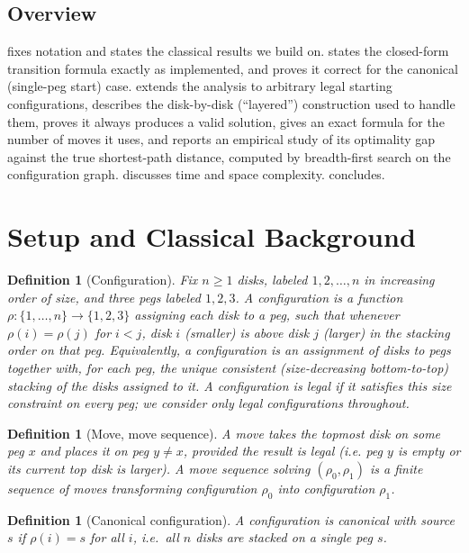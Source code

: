 \documentclass[11pt]{article}
\newtheorem{definition}[theorem]{Definition}
\begin{document}
\subsection{Overview}

 fixes notation and states the classical results we build
on.  states the closed-form transition formula exactly as
implemented, and proves it correct for the canonical (single-peg start)
case.  extends the analysis to arbitrary legal starting
configurations, describes the disk-by-disk (``layered'') construction used
to handle them, proves it always produces a valid solution, gives an exact
formula for the number of moves it uses, and reports an empirical study of
its optimality gap against the true shortest-path distance, computed by
breadth-first search on the configuration graph. 
discusses time and space complexity.  concludes.

\section{Setup and Classical Background}
\label{sec:setup}

\begin{definition}[Configuration]
Fix $n \ge 1$ disks, labeled $1, 2, \dots, n$ in increasing order of size,
and three pegs labeled $1,2,3$. A \emph{configuration} is a function
$\rho : \{1,\dots,n\} \to \{1,2,3\}$ assigning each disk to a peg, such that
whenever $\rho(i) = \rho(j)$ for $i < j$, disk $i$ (smaller) is above disk
$j$ (larger) in the stacking order on that peg. Equivalently, a
configuration is an assignment of disks to pegs together with, for each
peg, the unique consistent (size-decreasing bottom-to-top) stacking of the
disks assigned to it. A configuration is \emph{legal} if it satisfies this
size constraint on every peg; we consider only legal configurations
throughout.
\end{definition}

\begin{definition}[Move, move sequence]
A \emph{move} takes the topmost disk on some peg $x$ and places it on peg
$y \ne x$, provided the result is legal (i.e. peg $y$ is empty or its
current top disk is larger). A \emph{move sequence} solving
$(\rho_0, \rho_1)$ is a finite sequence of moves transforming configuration
$\rho_0$ into configuration $\rho_1$.
\end{definition}

\begin{definition}[Canonical configuration]
A configuration is \emph{canonical} with source $s$ if $\rho(i) = s$ for all
$i$, i.e.\ all $n$ disks are stacked on a single peg $s$.
\end{definition}
\end{document}
